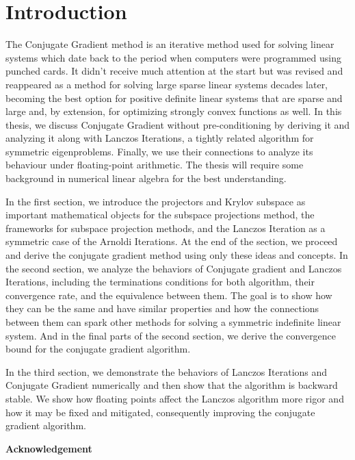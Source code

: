 \documentclass[]{article}
\theoremstyle{definition}
\begin{document}
\section{Introduction}
    The Conjugate Gradient method is an iterative method used for solving linear systems which date back to the period when computers were programmed using punched cards. It didn't receive much attention at the start but was revised and reappeared as a method for solving large sparse linear systems decades later, becoming the best option for positive definite linear systems that are sparse and large and, by extension, for optimizing strongly convex functions as well. In this thesis, we discuss Conjugate Gradient without pre-conditioning by deriving it and analyzing it along with Lanczos Iterations, a tightly related algorithm for symmetric eigenproblems. Finally, we use their connections to analyze its behaviour under floating-point arithmetic. The thesis will require some background in numerical linear algebra for the best understanding. 
    \par
    In the first section, we introduce the projectors and Krylov subspace as important mathematical objects for the subspace projections method, the frameworks for subspace projection methods, and the Lanczos Iteration as a symmetric case of the Arnoldi Iterations. At the end of the section, we proceed and derive the conjugate gradient method using only these ideas and concepts. In the second section, we analyze the behaviors of Conjugate gradient and Lanczos Iterations, including the terminations conditions for both algorithm, their convergence rate, and the equivalence between them. The goal is to show how they can be the same and have similar properties and how the connections between them can spark other methods for solving a symmetric indefinite linear system. And in the final parts of the second section, we derive the convergence bound for the conjugate gradient algorithm. 
    \par
    In the third section, we demonstrate the behaviors of Lanczos Iterations and Conjugate Gradient numerically and then show that the algorithm is backward stable. We show how floating points affect the Lanczos algorithm more rigor and how it may be fixed and mitigated, consequently improving the conjugate gradient algorithm. 

    \newpage
\begin{center}\large
    \textbf{Acknowledgement}
\end{center}


\newpage
\end{document}
